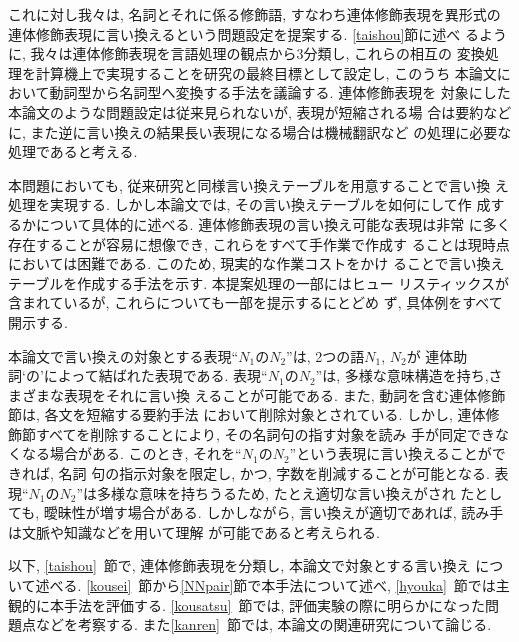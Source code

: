 これに対し我々は, 名詞とそれに係る修飾語, すなわち連体修飾表現を異形式の 
連体修飾表現に言い換えるという問題設定を提案する. \ref{taishou}節に述べ
るように, 我々は連体修飾表現を言語処理の観点から3分類し, これらの相互の
変換処理を計算機上で実現することを研究の最終目標として設定し, このうち
本論文において動詞型から名詞型へ変換する手法を議論する. 連体修飾表現を
対象にした本論文のような問題設定は従来見られないが, 表現が短縮される場
合は要約などに, また逆に言い換えの結果長い表現になる場合は機械翻訳など
の処理に必要な処理であると考える. 

本問題においても, 従来研究と同様言い換えテーブルを用意することで言い換
え処理を実現する. しかし本論文では, その言い換えテーブルを如何にして作
成するかについて具体的に述べる. 連体修飾表現の言い換え可能な表現は非常
に多く存在することが容易に想像でき, これらをすべて手作業で作成す
ることは現時点においては困難である. このため, 現実的な作業コストをかけ
ることで言い換えテーブルを作成する手法を示す. 本提案処理の一部にはヒュー
リスティックスが含まれているが, これらについても一部を提示するにとどめ
ず, 具体例をすべて開示する. 

本論文で言い換えの対象とする表現``$N_1のN_2$''は, 2つの語$N_1$, $N_2$が
連体助詞`の'によって結ばれた表現である.
表現``$N_1のN_2$''は, 多様な意味構造を持ち,さまざまな表現をそれに言い換
えることが可能である.
また, 動詞を含む連体修飾節は, 各文を短縮する要約手法
\cite{mikami99,yamamoto95}において削除対象とされている. 
しかし, 連体修飾節すべてを削除することにより, その名詞句の指す対象を読み
手が同定できなくなる場合がある. 
このとき, それを``$N_1のN_2$''という表現に言い換えることができれば, 名詞
句の指示対象を限定し, かつ, 字数を削減することが可能となる. 
表現``$N_1のN_2$''は多様な意味を持ちうるため, たとえ適切な言い換えがされ
たとしても, 曖昧性が増す場合がある.
しかしながら, 言い換えが適切であれば, 読み手は文脈や知識などを用いて理解
が可能であると考えられる.

以下, \ref{taishou}~節で, 連体修飾表現を分類し, 本論文で対象とする言い換え
について述べる.
\ref{kousei}~節から\ref{NNpair}節で本手法について述べ,
\ref{hyouka}~節では主観的に本手法を評価する.
\ref{kousatsu}~節では, 評価実験の際に明らかになった問題点などを考察する.
また\ref{kanren}~節では, 本論文の関連研究について論じる.

